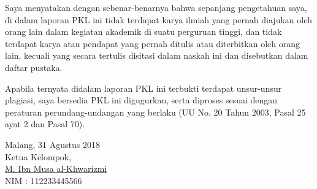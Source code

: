 \documentclass{pkl}
\begin{document}
\cover

\approvalpage



{\orisinalitas

  Saya menyatakan dengan sebenar-benarnya bahwa sepanjang pengetahuan
  saya, di dalam laporan PKL ini tidak terdapat karya ilmiah yang
  pernah diajukan oleh orang lain dalam kegiatan akademik di suatu
  perguruan tinggi, dan tidak terdapat karya atau pendapat yang pernah
  ditulis atau diterbitkan oleh orang lain, kecuali yang secara
  tertulis disitasi dalam naskah ini dan disebutkan dalam daftar
  pustaka.

  Apabila ternyata didalam laporan PKL ini terbukti terdapat
  unsur-unsur plagiasi, saya bersedia PKL ini digugurkan, serta
  diproses sesuai dengan peraturan perundang-undangan yang berlaku (UU
  No. 20 Tahun 2003, Pasal 25 ayat 2 dan Pasal 70).
  \vspace{1.5cm}

  \noindent
  \hspace*{8cm}Malang, 31 Agustus 2018  \\
  \hspace*{8cm}Ketua Kelompok,  \vspace{1.5cm} \\

  \hspace*{6.8cm}\underline{M. Ibn Musa al-Khwarizmi} \\
  \hspace*{8cm}NIM : 112233445566

}
\end{document}
